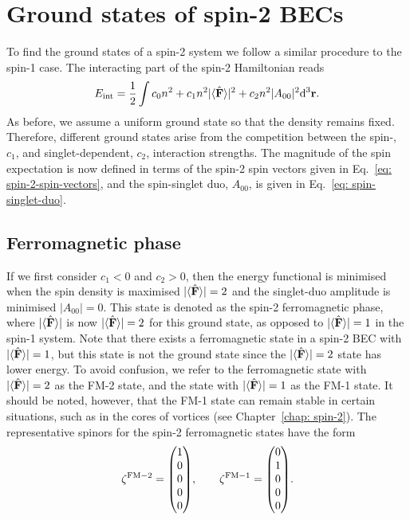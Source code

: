 \section{Ground states of spin-2 BECs}\label{sec: ground-states-spin-2}
To find the ground states of a spin-2 system we follow a similar procedure to
the spin-1 case.
The interacting part of the spin-2 Hamiltonian reads
\begin{align}
    E_\mathrm{int} = \frac{1}{2}\int c_0n^2 + c_1n^2|\langle \hat{\vb{F}} \rangle |^2+c_2n^2|A_{00}|^2
    \dd^3\vb{r}.
\end{align}
As before, we assume a uniform ground state so that the density remains fixed.
Therefore, different ground states arise from the competition between the spin-,
\(c_1\), and singlet-dependent, \(c_2\), interaction strengths.
The magnitude of the spin expectation is now defined in terms of the spin-2
spin vectors given in Eq.~\eqref{eq: spin-2-spin-vectors}, and the spin-singlet
duo, \(A_{00}\), is given in Eq.~\eqref{eq: spin-singlet-duo}.

\subsection{Ferromagnetic phase}
If we first consider \(c_1 < 0\) and \(c_2 > 0\), then the energy functional is
minimised when  the spin density is maximised \(|\langle \hat{\vb{F}} \rangle |=2\)
and the singlet-duo amplitude is minimised \(|A_{00}|=0\).
This state is denoted as the spin-2 ferromagnetic phase, where \(|\langle \hat{\vb{F}} \rangle | \) is
now \(|\langle \hat{\vb{F}} \rangle |=2\) for this ground state, as opposed to \(|\langle \hat{\vb{F}} \rangle |=1\) in the
spin-1 system.
Note that there exists a ferromagnetic state in a spin-2 BEC with
\(|\langle \hat{\vb{F}} \rangle |=1\), but this state is not the ground state since the \(|\langle \hat{\vb{F}} \rangle |=2\)
state has lower energy.
To avoid confusion, we refer to the ferromagnetic state with \(|\langle \hat{\vb{F}} \rangle |=2\) as
the FM-2 state, and the state with \(|\langle \hat{\vb{F}} \rangle |=1\) as the FM-1 state.
It should be noted, however, that the FM-1 state can remain stable in
certain situations, such as in the cores of vortices (see
Chapter~\ref{chap: spin-2}).
The representative spinors for the spin-2 ferromagnetic states have the form
\begin{equation}\label{eq: FM2-FM1-spinors}
    \zeta^\mathrm{FM-2} = \mqty(1 \\ 0 \\ 0 \\ 0 \\ 0), \qquad
    \zeta^\mathrm{FM-1} = \mqty(0 \\ 1 \\ 0 \\ 0 \\ 0).
\end{equation}

